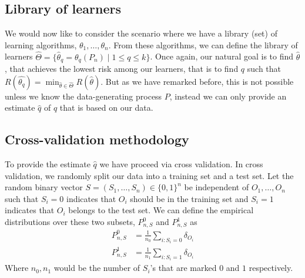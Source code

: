 \documentclass[11pt, a4paper]{article}
\theoremstyle{definition}
\theoremstyle{remark}
\newcommand{\q}{q}
\newcommand{\ml}{k}
\newcommand{\btheta}{\theta}
\newcommand{\lib}{\hat{\Theta}}
\begin{document}
\subsection{Library of learners}
We would now like to consider the scenario where we have a library (set) of learning algorithms, $ \btheta_1 , \ldots, \btheta_n $. From these algorithms, we can define the library of learners $ \lib = \{ \hat{\btheta}_\q = \btheta_{\q}(P_n) \mid 1 \leq \q \leq \ml \} $. Once again, our natural goal is to find $ \hat{\btheta} $, that achieves the lowest risk among our learners, that is to find $ \q $ such that $ R( \hat{\btheta_{\q}} ) = \min_{ \hat{\btheta}  \in \hat{\Theta} } R( \hat{\btheta} ) $. But as we have remarked before, this is not possible unless we know the data-generating process $ P $, instead we can only provide an estimate $ \hat{\q} $ of $ q $ that is based on our data.


\subsection{Cross-validation methodology}
To provide the estimate $ \hat{\q} $ we have proceed via cross validation. In cross validation, we randomly split our data into a training set and a test set. Let the random binary vector $ S = (S_1,\ldots,S_n) \in \{0,1\}^{n} $ be independent of $ O_1,\ldots, O_n $ such that $ S_i = 0 $ indicates that $ O_i $ should be in the training set and $ S_i = 1 $ indicates that $ O_i $ belongs to the test set. We can define the empirical distributions over these two subsets, $ P_{n,S}^0$ and $ P_{n,S}^{1} $ as
\begin{align*}
    P_{n,S}^{0} &= \frac{1}{n_0} \sum_{i: S_i = 0} \delta_{O_i} \\
    P_{n,S}^{1} &= \frac{1}{n_1} \sum_{i: S_i = 1} \delta_{O_i} 
\end{align*}
Where $ n_0, n_1 $ would be the number of $ S_i $'s that are marked $ 0 $ and $ 1 $ respectively. 
\end{document}
